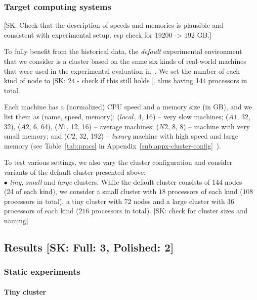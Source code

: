 \documentclass[conference]{IEEEtran}
\newcommand{\skug}[1]{{\color{blue}[SK: #1]}}
\begin{document}
    \subsubsection{Target computing systems}
    \skug{Check that the description of speeds and memories is plausible and consistent with experimental setup. esp check for 19200 -> 192 GB.}

    To fully benefit from the historical data, the  {\em default} experimental environment
    that we consider is a cluster based on the same six
    kinds of real-world machines that were used in the experimental evaluation in~\cite{lotaru}.
    We set the number of each kind of node to \skug{$24$ - check if this still holds }, thus having 144 processors in total. %

    Each machine has a (normalized) CPU speed and a memory size (in GB), and we list them as (name, speed, memory):
    ($local$, 4, 16) -- very slow machines; ($A1$, 32, 32), ($A2$, 6, 64), ($N1$, 12, 16) -- average machines; ($N2$, 8, 8) -- machine with very small memory; and ($C2$, 32, 192) -- {\em luxury} machine with high speed and large memory
    (see Table~\ref{tab:procs} in Appendix~\ref{sub:appx-cluster-config}~\cite{daghetpart_full_version}).

    To test various settings, we also vary the cluster configuration and consider
    variants of the default cluster presented above:\\
    $\bullet$ {\em tiny}, {\em small} and {\em large} clusters. While the default cluster consists of 144 nodes (24 of each kind), we
    consider a small cluster with $18$ processors of each kind ($108$ processors in total), a tiny cluster with $72$ nodes and a
    large cluster with $36$ processors of each kind ($216$ processors in total). \skug{check for cluster sizes and naming}\\



    \subsection{Results \skug{Full: 3, Polished: 2}}
    \subsubsection{Static experiments}
    \paragraph{Tiny cluster}
\end{document}
